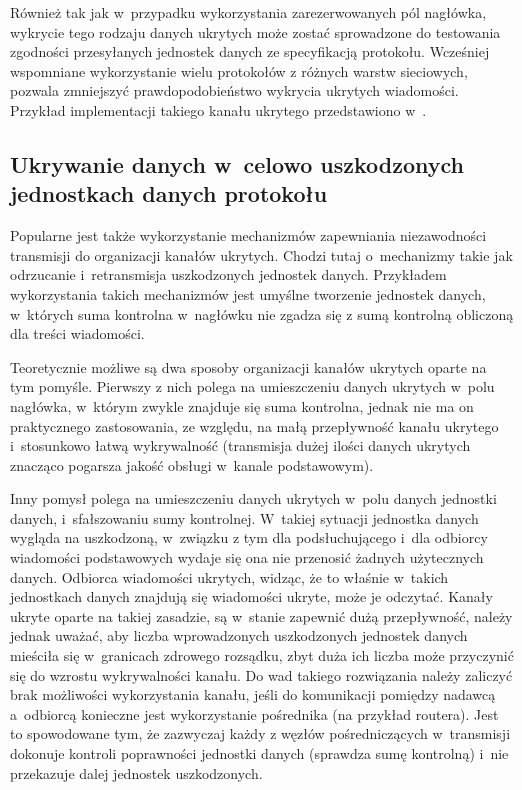 \documentclass[a4paper, twoside, openright, 12pt]{report}
\begin{document}
        Również tak jak w~przypadku wykorzystania zarezerwowanych pól nagłówka,
        wykrycie tego rodzaju danych ukrytych może zostać sprowadzone do testowania
        zgodności przesyłanych jednostek danych ze specyfikacją protokołu. Wcześniej wspomniane
        wykorzystanie wielu protokołów z różnych warstw sieciowych, pozwala zmniejszyć
        prawdopodobieństwo wykrycia ukrytych wiadomości. Przykład implementacji
        takiego kanału ukrytego przedstawiono w~\cite{PADSTEG}.

        \subsection{Ukrywanie danych w~celowo uszkodzonych jednostkach danych protokołu} \label{USZKODZONEPAKIETY}
        Popularne jest także wykorzystanie mechanizmów zapewniania niezawodności
        transmisji do organizacji kanałów ukrytych. Chodzi tutaj o~mechanizmy
        takie jak odrzucanie i~retransmisja uszkodzonych jednostek danych. Przykładem wykorzystania takich
        mechanizmów jest umyślne tworzenie jednostek danych, w~których suma kontrolna w~nagłówku
        nie zgadza się z sumą kontrolną obliczoną dla treści wiadomości.

        Teoretycznie możliwe są dwa
        sposoby organizacji kanałów ukrytych oparte na tym pomyśle. Pierwszy z nich polega na umieszczeniu
        danych ukrytych w~polu nagłówka, w~którym zwykle znajduje się suma kontrolna,
        jednak nie ma on praktycznego zastosowania, ze względu, na małą przepływność
        kanału ukrytego i~stosunkowo łatwą wykrywalność (transmisja dużej ilości
        danych ukrytych znacząco pogarsza jakość obsługi w~kanale podstawowym).

        Inny pomysł polega
        na umieszczeniu danych ukrytych w~polu danych jednostki danych, i~sfałszowaniu sumy
        kontrolnej. W~takiej sytuacji jednostka danych wygląda na uszkodzoną, w~związku z tym
        dla podsłuchującego i~dla odbiorcy wiadomości podstawowych wydaje się
        ona nie przenosić żadnych użytecznych danych. Odbiorca wiadomości ukrytych,
        widząc, że to właśnie w~takich jednostkach danych znajdują się wiadomości ukryte,
        może je odczytać. Kanały ukryte oparte na takiej zasadzie, są w~stanie
        zapewnić dużą przepływność, należy jednak uważać, aby liczba wprowadzonych
        uszkodzonych jednostek danych mieściła się w~granicach zdrowego rozsądku, zbyt duża
        ich liczba może przyczynić się do wzrostu wykrywalności kanału. Do wad takiego
        rozwiązania należy zaliczyć brak możliwości wykorzystania kanału, jeśli do
        komunikacji pomiędzy nadawcą a~odbiorcą konieczne jest wykorzystanie pośrednika (na przykład routera).
        Jest to spowodowane tym, że zazwyczaj każdy z węzłów pośredniczących w~transmisji
        dokonuje kontroli poprawności jednostki danych (sprawdza sumę kontrolną) i~nie przekazuje
        dalej jednostek uszkodzonych.
\end{document}
